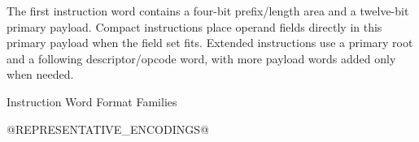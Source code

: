 The first instruction word contains a four-bit prefix/length area and a twelve-bit primary payload. Compact
instructions place operand fields directly in this primary payload when the field set fits. Extended
instructions use a primary root and a following descriptor/opcode word, with more payload words added only
when needed.

\begin{manuallistedbitdiagram}{Instruction Word Format Families}
\end{manuallistedbitdiagram}


@REPRESENTATIVE_ENCODINGS@
